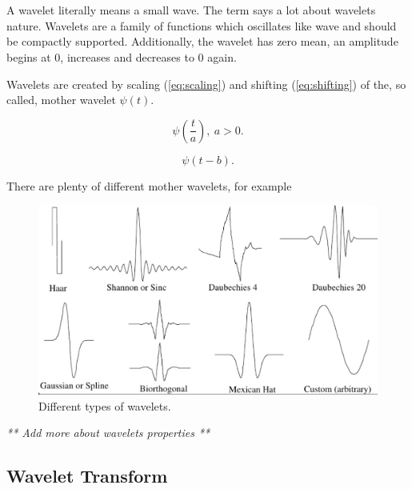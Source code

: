 \chapter{}
A wavelet literally means a small wave. The term says a lot about wavelets nature. Wavelets are a family of functions which oscillates like wave and should be compactly supported. Additionally, the wavelet has zero mean, an amplitude begins at 0, increases and decreases to 0 again.

\begin{defn}
Wavelets are created by scaling (\ref{eq:scaling}) and shifting (\ref{eq:shifting}) of the, so called, mother wavelet $\psi(t)$.

\begin{equation}
\label{eq:scaling}
\psi\left(\frac{t}{a}\right),\ a>0.
\end{equation}

\begin{equation}
\label{eq:shifting}
\psi(t-b).
\end{equation}

\end{defn}


There are plenty of different mother wavelets, for example

\begin{figure}[h]
	\centering
	\includegraphics[width=\textwidth]{wavelets_with_bottom_line.png}
	\caption{Different types of wavelets.}
	\label{fig:wavelets}
\end{figure}

\textit{** Add more about wavelets properties **}

\section{Wavelet Transform}

